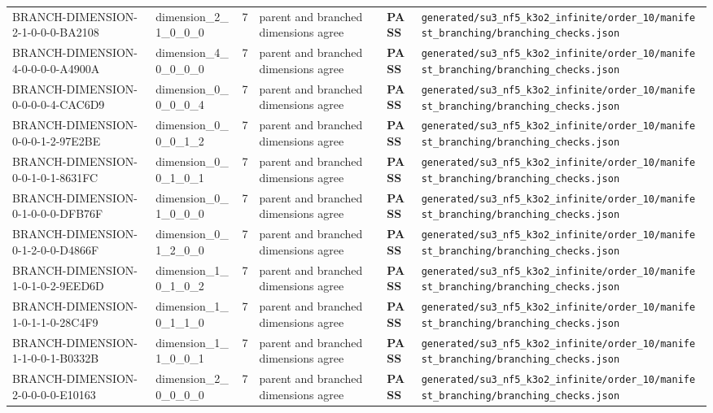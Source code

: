 \documentclass[11pt]{article}
\newcommand{\Pass}{\textcolor{green!50!black}{\textbf{PASS}}}
\newcommand{\RawPath}[1]{\texttt{#1}}
\begin{document}
\begin{longtable}{p{3cm}p{2.5cm}r p{3cm}l p{2cm}}
BRANCH-DIMENSION-2-1-0-0-0-BA2108 & dimension\_2\_1\_0\_0\_0 & 7 & parent and branched dimensions agree & \Pass & \RawPath{generated/su3\_nf5\_k3o2\_infinite/order\_10/manifest\_branching/branching\_checks.json}\\
BRANCH-DIMENSION-4-0-0-0-0-A4900A & dimension\_4\_0\_0\_0\_0 & 7 & parent and branched dimensions agree & \Pass & \RawPath{generated/su3\_nf5\_k3o2\_infinite/order\_10/manifest\_branching/branching\_checks.json}\\
BRANCH-DIMENSION-0-0-0-0-4-CAC6D9 & dimension\_0\_0\_0\_0\_4 & 7 & parent and branched dimensions agree & \Pass & \RawPath{generated/su3\_nf5\_k3o2\_infinite/order\_10/manifest\_branching/branching\_checks.json}\\
BRANCH-DIMENSION-0-0-0-1-2-97E2BE & dimension\_0\_0\_0\_1\_2 & 7 & parent and branched dimensions agree & \Pass & \RawPath{generated/su3\_nf5\_k3o2\_infinite/order\_10/manifest\_branching/branching\_checks.json}\\
BRANCH-DIMENSION-0-0-1-0-1-8631FC & dimension\_0\_0\_1\_0\_1 & 7 & parent and branched dimensions agree & \Pass & \RawPath{generated/su3\_nf5\_k3o2\_infinite/order\_10/manifest\_branching/branching\_checks.json}\\
BRANCH-DIMENSION-0-1-0-0-0-DFB76F & dimension\_0\_1\_0\_0\_0 & 7 & parent and branched dimensions agree & \Pass & \RawPath{generated/su3\_nf5\_k3o2\_infinite/order\_10/manifest\_branching/branching\_checks.json}\\
BRANCH-DIMENSION-0-1-2-0-0-D4866F & dimension\_0\_1\_2\_0\_0 & 7 & parent and branched dimensions agree & \Pass & \RawPath{generated/su3\_nf5\_k3o2\_infinite/order\_10/manifest\_branching/branching\_checks.json}\\
BRANCH-DIMENSION-1-0-1-0-2-9EED6D & dimension\_1\_0\_1\_0\_2 & 7 & parent and branched dimensions agree & \Pass & \RawPath{generated/su3\_nf5\_k3o2\_infinite/order\_10/manifest\_branching/branching\_checks.json}\\
BRANCH-DIMENSION-1-0-1-1-0-28C4F9 & dimension\_1\_0\_1\_1\_0 & 7 & parent and branched dimensions agree & \Pass & \RawPath{generated/su3\_nf5\_k3o2\_infinite/order\_10/manifest\_branching/branching\_checks.json}\\
BRANCH-DIMENSION-1-1-0-0-1-B0332B & dimension\_1\_1\_0\_0\_1 & 7 & parent and branched dimensions agree & \Pass & \RawPath{generated/su3\_nf5\_k3o2\_infinite/order\_10/manifest\_branching/branching\_checks.json}\\
BRANCH-DIMENSION-2-0-0-0-0-E10163 & dimension\_2\_0\_0\_0\_0 & 7 & parent and branched dimensions agree & \Pass & \RawPath{generated/su3\_nf5\_k3o2\_infinite/order\_10/manifest\_branching/branching\_checks.json}\\

\end{longtable}
\end{document}
